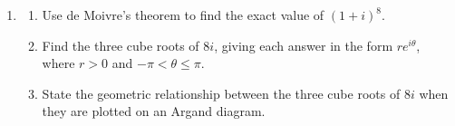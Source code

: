 \documentclass[12pt, twoside]{article}
\begin{document}
\begin{enumerate}[itemsep=0.15cm]

\newpage

\item[2.]

\begin{enumerate}[itemsep=0.15cm]
  \item Use de Moivre's theorem to find the exact value of $(1 + i)^8$.

  \item Find the three cube roots of $8i$, giving each answer in the form
  $re^{i\theta}$, where $r > 0$ and $-\pi < \theta \leq \pi$.
  \item State the geometric relationship between the three cube roots of
  $8i$ when they are plotted on an Argand diagram.
\end{enumerate}


\end{enumerate}
\end{document}
